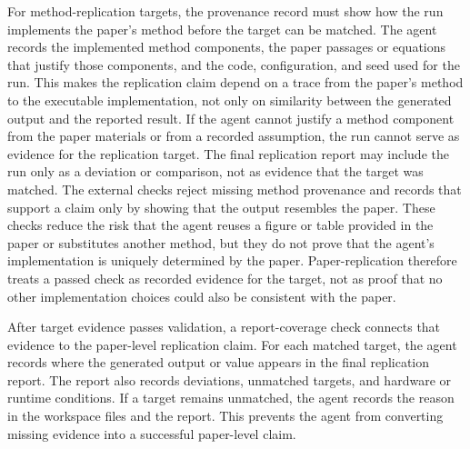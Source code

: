 \documentclass[authoryear,5p,times,nopreprintline]{elsarticle}
\begin{document}
For method-replication targets, the provenance record must show how the run implements the paper's method before the target can be matched.
The agent records the implemented method components, the paper passages or equations that justify those components, and the code, configuration, and seed used for the run.
This makes the replication claim depend on a trace from the paper's method to the executable implementation, not only on similarity between the generated output and the reported result.
If the agent cannot justify a method component from the paper materials or from a recorded assumption, the run cannot serve as evidence for the replication target.
The final replication report may include the run only as a deviation or comparison, not as evidence that the target was matched.
The external checks reject missing method provenance and records that support a claim only by showing that the output resembles the paper.
These checks reduce the risk that the agent reuses a figure or table provided in the paper or substitutes another method, but they do not prove that the agent's implementation is uniquely determined by the paper.
Paper-replication therefore treats a passed check as recorded evidence for the target, not as proof that no other implementation choices could also be consistent with the paper.

After target evidence passes validation, a report-coverage check connects that evidence to the paper-level replication claim.
For each matched target, the agent records where the generated output or value appears in the final replication report.
The report also records deviations, unmatched targets, and hardware or runtime conditions.
If a target remains unmatched, the agent records the reason in the workspace files and the report.
This prevents the agent from converting missing evidence into a successful paper-level claim.
\end{document}

